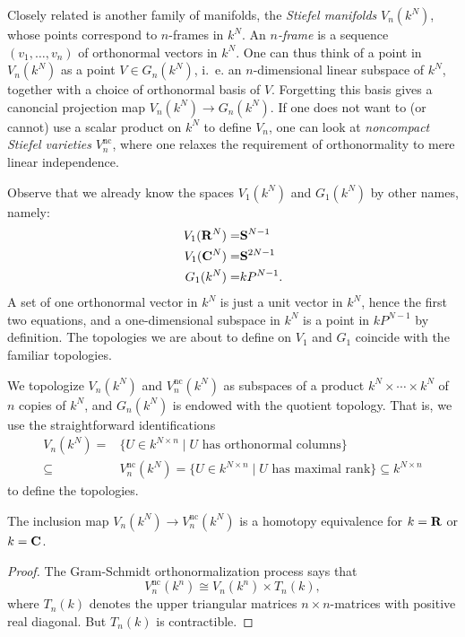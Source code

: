\documentclass[a4paper,openany]{scrbook}
\begin{document}
Closely related is another family of manifolds, the \emph{Stiefel manifolds} $V_n(k^N)$, whose points correspond to $n$-frames in $k^N$. An \emph{$n$-frame} is a sequence $(v_1,\dots,v_n)$ of orthonormal vectors in $k^N$. One can thus think of a point in $V_n(k^N)$ as a point $V \in G_n(k^N)$, i.~e. an $n$-dimensional linear subspace of $k^N$, together with a choice of orthonormal basis of $V$. Forgetting this basis gives a canoncial projection map $V_n(k^N) \to G_n(k^N)$. If one does not want to (or cannot) use a scalar product on $k^N$ to define $V_n$, one can look at \emph{noncompact Stiefel varieties} $V_n^{\operatorname{nc}}$, where one relaxes the requirement of orthonormality to mere linear independence.

Observe that we already know the spaces $V_1(k^N)$ and $G_1(k^N)$ by other names, namely:
\begin{eqnarray*}
V_1(\mathbf R^{N}) =& \mathbf S^{N-1}\\
V_1(\mathbf C^N) =& \mathbf S^{2N-1}\\
G_1(k^N) =& k P^{N-1}.
\end{eqnarray*}
A set of one orthonormal vector in $k^N$ is just a unit vector in $k^N$, hence the first two equations, and a one-dimensional subspace in $k^N$ is a point in $k P^{N-1}$ by definition. The topologies we are about to define on $V_1$ and $G_1$ coincide with the familiar topologies.

We topologize $V_n(k^N)$ and $V_n^{\operatorname{nc}}(k^N)$ as subspaces of a product $k^N \times \cdots \times k^N$ of $n$ copies of $k^N$, and $G_n(k^N)$ is endowed with the quotient topology. That is, we use the straightforward identifications
\begin{align*}
V_n(k^N) = & \{ U \in k^{N \times n} \mid U \text{ has orthonormal columns}\} \\
\subseteq & V_n^{\operatorname{nc}}(k^N) = \{ U \in k^{N \times n} \mid U \text{ has maximal rank}\} \subseteq k^{N \times n}
\end{align*}
to define the topologies.

\begin{lemma}
The inclusion map $V_n(k^N) \to V_n^{\operatorname{nc}}(k^N)$ is a homotopy equivalence for $k=\mathbf R$ or $k=\mathbf C$.
\end{lemma}
\begin{proof}
The Gram-Schmidt orthonormalization process says that
\[
V_n^{\operatorname{nc}}(k^n) \cong V_n(k^n) \times T_n(k),
\]
where $T_n(k)$ denotes the upper triangular matrices $n\times n$-matrices with positive real diagonal. But $T_n(k)$ is contractible.
\end{proof}
\end{document}
